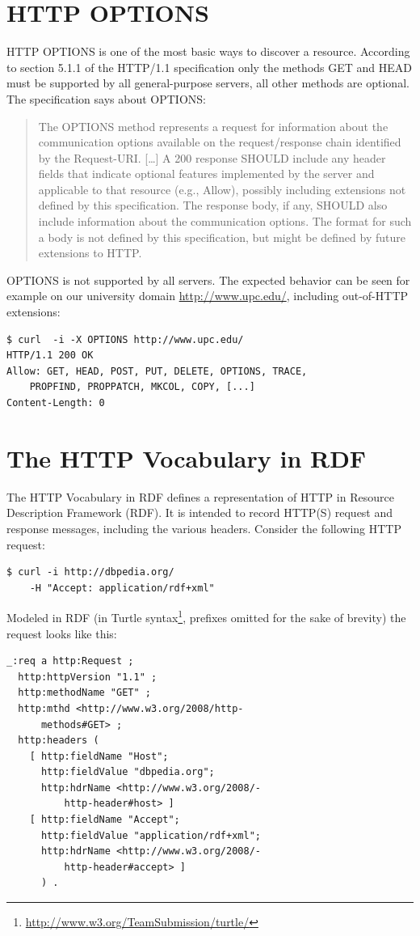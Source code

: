 \documentclass{acm_proc_article-sp}
\begin{document}
\section{HTTP OPTIONS}\label{sec:httpoptions}
HTTP OPTIONS is one of the most basic ways to discover a resource. According to section 5.1.1 of the HTTP/1.1 specification\cite{HTTP:Spec} only the methods GET and HEAD must be supported by all general-purpose servers, all other methods are optional. The specification says about OPTIONS:
\begin{quote}
The OPTIONS method represents a request for information about the communication options available on the request/response chain identified by the Request-URI. [\ldots] A 200 response SHOULD include any header fields that indicate optional features implemented by the server and applicable to that resource (e.g., Allow), possibly including extensions not defined by this specification. The response body, if any, SHOULD also include information about the communication options. The format for such a body is not defined by this specification, but might be defined by future extensions to HTTP.
\end{quote}
OPTIONS is not supported by all servers. The expected behavior can be seen for example on our university domain \url{http://www.upc.edu/}, including out-of-HTTP extensions:
\begin{verbatim}
$ curl  -i -X OPTIONS http://www.upc.edu/
HTTP/1.1 200 OK
Allow: GET, HEAD, POST, PUT, DELETE, OPTIONS, TRACE,
    PROPFIND, PROPPATCH, MKCOL, COPY, [...]
Content-Length: 0
\end{verbatim}

\section{The HTTP Vocabulary in RDF}\label{sec:httpvocab}
The HTTP Vocabulary in RDF\cite{HTTP:RDF} defines a representation of HTTP in Resource Description Framework (RDF)\cite{W3C:RDF}. It is intended to record HTTP(S) request and response messages, including the various headers. Consider the following HTTP request:
\begin{verbatim}
$ curl -i http://dbpedia.org/
    -H "Accept: application/rdf+xml"
\end{verbatim}
Modeled in RDF (in Turtle syntax\footnote{\url{http://www.w3.org/TeamSubmission/turtle/}}, prefixes omitted for the sake of brevity) the request looks like this:
\begin{verbatim}
_:req a http:Request ;
  http:httpVersion "1.1" ;
  http:methodName "GET" ;
  http:mthd <http://www.w3.org/2008/http-
      methods#GET> ;
  http:headers (
    [ http:fieldName "Host";
      http:fieldValue "dbpedia.org";
      http:hdrName <http://www.w3.org/2008/-
          http-header#host> ]
    [ http:fieldName "Accept";
      http:fieldValue "application/rdf+xml";
      http:hdrName <http://www.w3.org/2008/-
          http-header#accept> ]
      ) .
\end{verbatim}
\end{document}
